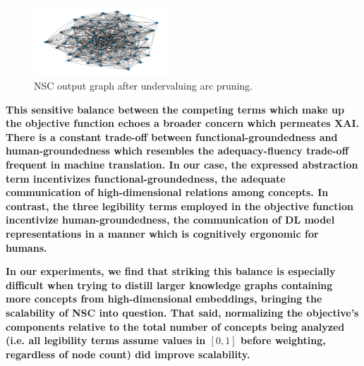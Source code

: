 \begin{figure}[h]
    \centering
    \includegraphics[width=0.45\textwidth]{img/short_run.png}
    \caption{NSC output graph after undervaluing arc pruning.}\label{fig:pruning}
\end{figure}

\textbf{This sensitive balance between the competing terms which make up the objective function echoes a broader concern which permeates XAI. There is a constant trade-off between functional-groundedness and human-groundedness which resembles the adequacy-fluency trade-off frequent in machine translation. In our case, the expressed abstraction term incentivizes functional-groundedness, the adequate communication of high-dimensional relations among concepts. In contrast, the three legibility terms employed in the objective function incentivize human-groundedness, the communication of DL model representations in a manner which is cognitively ergonomic for humans.
}

\textbf{In our experiments, we find that striking this balance is especially difficult when trying to distill larger knowledge graphs containing more concepts from high-dimensional embeddings, bringing the scalability of NSC into question. That said, normalizing the objective's components relative to the total number of concepts being analyzed (i.e. all legibility terms assume values in $[0, 1]$ before weighting, regardless of node count) did improve scalability.}
